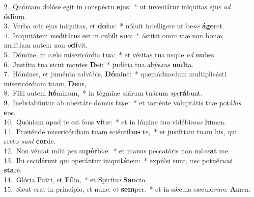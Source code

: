 {2.~}Quóniam dolóse egit in conspéctu \textbf{e}jus:~* ut inveniátur iníquitas ejus \textit{ad} \textbf{ó}\textbf{di}um.\\
{3.~}Verba oris ejus iníquitas, et \textbf{do}lus:~* nóluit intellígere ut be\textit{ne} \textbf{á}\textbf{ge}ret.\\
{4.~}Iniquitátem meditátus est in cubíli \textbf{su}o:~* ástitit omni viæ non bonæ, malítiam autem non \textit{o}\textbf{dí}vit.\\
{5.~}Dómine, in cælo misericórdia \textbf{tu}a:~* et véritas tua usque \textit{ad} \textbf{nu}bes.\\
{6.~}Justítia tua sicut montes \textbf{De}i:~* judícia tua abýs\textit{sus} \textbf{mul}ta.\\
{7.~}Hómines, et juménta salvábis, \textbf{Dó}mine:~* quemádmodum multiplicásti misericórdiam tu\textit{am}, \textbf{De}us,\\
{8.~}Fílii autem \textbf{hó}minum,~* in tégmine alárum tuárum \textit{spe}\textbf{rá}bunt.\\
{9.~}Inebriabúntur ab ubertáte domus \textbf{tu}æ:~* et torrénte voluptátis tuæ potá\textit{bis} \textbf{e}os.\\
{10.~}Quóniam apud te est fons \textbf{vi}tæ:~* et in lúmine tuo vidébi\textit{mus} \textbf{lu}men.\\
{11.~}Præténde misericórdiam tuam sciénti\textbf{bus} te,~* et justítiam tuam his, qui recto \textit{sunt} \textbf{cor}de.\\
{12.~}Non véniat mihi pes su\textbf{pér}biæ:~* et manus peccatóris non mó\textit{ve}\textbf{at} me.\\
{13.~}Ibi cecidérunt qui operántur iniqui\textbf{tá}tem:~* expúlsi sunt, nec potué\textit{runt} \textbf{sta}re.\\
{14.~}Glória Patri, et \textbf{Fí}lio,~* et Spirítu\textit{i} \textbf{San}cto.\\
{15.~}Sicut erat in princípio, et nunc, et \textbf{sem}per,~* et in sǽcula sæculó\textit{rum}. \textbf{A}men.\\
